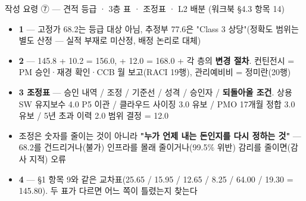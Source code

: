 \begin{frame}{작성 요령 ⑦ — 견적 등급 · 3층 표 · 조정표 · L2 배분 (워크북 §4.3 항목 1\til{}4)}
\begin{itemize}
\item \textbf{1} — 고정가 68.2는 등급 대상 아님, 추정부 77.6은 "Class 3 상당"(정확도 범위는 별도 산정 — 실적 부재로 미산정, 배정 논리로 대체)
\item \textbf{2} — 145.8 + 10.2 = 156.0, + 12.0 = 168.0 + 각 층의 \textbf{변경 절차}. 컨틴전시 = PM 승인·재경 확인·CCB 월 보고(RACI 19행), 관리예비비 = 정미란(20행)
\item \textbf{3 조정표} — 승인 내역 / 조정 / 기준선 / 성격 / 승인자 / \textbf{되돌아올 조건}. 상용SW 유지보수 4.0 \ra{} P5 이관 / 클라우드 사이징 3.0 \ra{} 유보 / PMO 17개월 정합 3.0 \ra{} 유보 / 5년 초과 이력 2.0 \ra{} 범위 결정 = 12.0
\item 조정은 숫자를 줄이는 것이 아니라 \textbf{"누가 언제 내는 돈인지를 다시 정하는 것"} — 68.2를 건드리거나(불가) 인프라를 몰래 줄이거나(99.5\% 위반) 감리를 줄이면(감사 지적) 오류
\item \textbf{4} — §1 항목 9와 같은 교차표(25.65 / 15.95 / 12.65 / 8.25 / 64.00 / 19.30 = 145.80). 두 표가 다르면 어느 쪽이 틀렸는지 찾는다
\end{itemize}
\end{frame}

